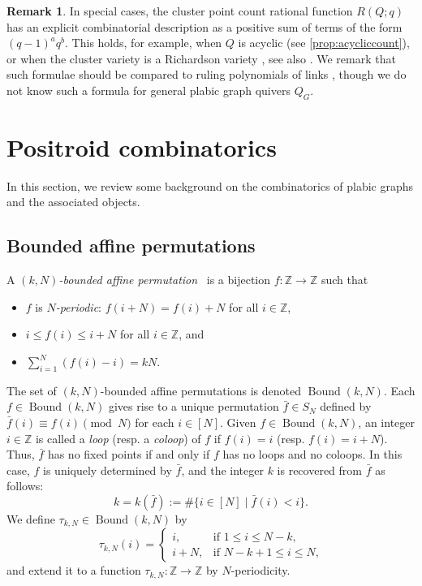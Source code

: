 \documentclass[11pt]{article}
\theoremstyle{definition}
\newtheorem{remark}[theo]{Remark}
\numberwithin{equation}{section}
\newcommand\Z{\mathbb{Z}}
\newcommand\Boundkn{\operatorname{Bound}(k,\n)}
\newcommand\Sn{S_\n}
\newcommand\fbar{\bar f}
\newcommand\taukn{\tau_{k,\n}}
\newcommand\n{N}
\begin{document}
\begin{remark}
In special cases, the cluster point count rational function $R(Q;q)$ has an explicit combinatorial description as a positive sum of terms of the form $(q-1)^a q^b$.  This holds, for example, when $Q$ is acyclic \cite{LS2} (see \cref{prop:acycliccount}), or when the cluster variety is a Richardson variety \cite{Deodhar}, see also \cite[Section 9]{GL_qtcat}.    We remark that such formulae should be compared to ruling polynomials of links \cite{Ruth}, though we do not know such a formula for general plabic graph quivers $Q_G$.
\end{remark}

\section{Positroid combinatorics}\label{sec:positr-comb}
In this section, we review some background on the combinatorics of plabic graphs and the associated objects.


\subsection{Bounded affine permutations}\label{sec:bound-affine-perm}
A \emph{$(k,\n)$-bounded affine permutation}~\cite{KLS} is a bijection $f:\Z\to\Z$ such that 
\begin{itemize}
\item $f$ is \emph{$\n$-periodic}: $f(i+\n)=f(i)+\n$ for all $i\in \Z$,
\item  $i\leq f(i)\leq i+\n$ for all $i\in\Z$, and %
\item $\sum_{i=1}^\n(f(i)-i)=k\n$.
\end{itemize}
The set of $(k,\n)$-bounded affine permutations is denoted $\Boundkn$. Each $f\in\Boundkn$ gives rise to a unique permutation $\fbar\in\Sn$ defined by $\fbar(i)\equiv f(i)\pmod \n$ for each $i\in[\n]$. Given $f\in\Boundkn$, an integer $i\in\Z$ is called a \emph{loop} (resp. a \emph{coloop}) of $f$ if $f(i)=i$ (resp. $f(i)=i+\n$). Thus, $\fbar$ has no fixed points if and only if $f$ has no loops and no coloops. In this case, $f$ is uniquely determined by $\fbar$, and the integer $k$ is recovered from $\fbar$ as follows:
\begin{equation*}%
  k=k(\fbar):=\#\{i\in[\n]\mid \fbar(i)<i\}.
\end{equation*}
We define $\taukn\in\Boundkn$  by
\begin{equation*}%
  \taukn(i)=
  \begin{cases}
    i, &\text{if $1\leq i\leq \n-k$,}\\
    i+\n, &\text{if $\n-k+1\leq i\leq \n$,}
  \end{cases}
\end{equation*}
and extend it to a function $\taukn:\Z\to\Z$ by $\n$-periodicity. 
\end{document}
